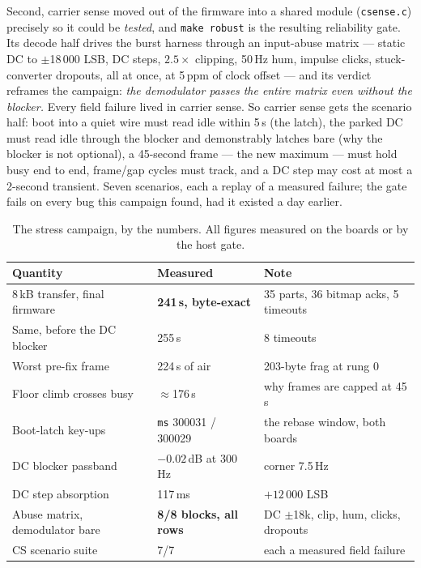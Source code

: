 Second, carrier sense moved out of the firmware into a shared module
(\texttt{csense.c}) precisely so it could be \emph{tested}, and
\texttt{make robust} is the resulting reliability gate. Its decode half
drives the burst harness through an input-abuse matrix --- static DC to
$\pm$18\,000 LSB, DC steps, $2.5\times$ clipping, 50\,Hz hum, impulse
clicks, stuck-converter dropouts, all at once, at 5\,ppm of clock
offset --- and its verdict reframes the campaign: \emph{the
demodulator passes the entire matrix even without the blocker.} Every
field failure lived in carrier sense. So carrier sense gets the
scenario half: boot into a quiet wire must read idle within 5\,s (the
latch), the parked DC must read idle through the blocker and
demonstrably latches bare (why the blocker is not optional), a 45-second
frame --- the new maximum --- must hold busy end to end, frame/gap
cycles must track, and a DC step may cost at most a 2-second transient.
Seven scenarios, each a replay of a measured failure; the gate fails on
every bug this campaign found, had it existed a day earlier.

\begin{table}[H]
    \centering
    \caption{The stress campaign, by the numbers. All figures measured
             on the boards or by the host gate.}
    \label{tab:harden}
    \small
    \begin{tabular}{@{}lll@{}}
    \toprule
    \textbf{Quantity} & \textbf{Measured} & \textbf{Note} \\
    \midrule
    8\,kB transfer, final firmware & \textbf{241\,s, byte-exact} & 35
        parts, 36 bitmap acks, 5 timeouts \\
    Same, before the DC blocker & 255\,s & 8 timeouts \\
    Worst pre-fix frame & 224\,s of air & 203-byte frag at rung 0 \\
    Floor climb crosses busy & $\approx$176\,s & why frames are capped
        at 45\,s \\
    Boot-latch key-ups & \texttt{ms} 300031 / 300029 & the rebase
        window, both boards \\
    DC blocker passband & $-0.02$\,dB at 300\,Hz & corner 7.5\,Hz \\
    DC step absorption & 117\,ms & $+12\,000$ LSB \\
    Abuse matrix, demodulator bare & \textbf{8/8 blocks, all rows} &
        DC $\pm$18k, clip, hum, clicks, dropouts \\
    CS scenario suite & 7/7 & each a measured field failure \\
    \bottomrule
    \end{tabular}
\end{table}

